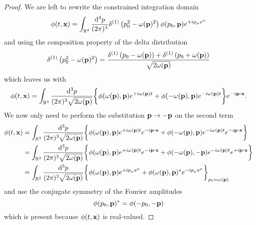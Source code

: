 \begin{proof}
	We are left to rewrite the constrained integration domain
	\begin{equation*}
		\phi(t,\vb{x})
		=
		\int_{\mathbb{R}^4}\frac{\dd[4]{p}}{(2\pi)^3}
		\delta^{(1)}\left(p_0^2-\omega(\vb{p})^2\right)
		\phi(p_0,\vb{p})
		e^{+ip_\mu x^\mu}
	\end{equation*}
	and using the composition property of the delta distribution
	\begin{equation*}
		\delta^{(1)}\left(p_0^2-\omega(\vb{p})^2\right)
		=
		\frac{
			\delta^{(1)}\left(p_0-\omega(\vb{p})\right)
			+
			\delta^{(1)}\left(p_0+\omega(\vb{p})\right)
		}{\sqrt{2\omega(\vb{p})}}
	\end{equation*}
	which leaves us with
	\begin{equation*}
		\phi(t,\vb{x})
		=
		\int_{\mathbb{R}^3}\frac{\dd[3]{p}}{(2\pi)^3\sqrt{2\omega(\vb{p})}}
		\biggl\{
			\phi(\omega(\vb{p}),\vb{p})
			e^{+i\omega(\vb{p})t}
			+
			\phi(-\omega(\vb{p}),\vb{p})
			e^{-i\omega(\vb{p})t}
		\biggr\}
		e^{-i\vb{p}\vdot\vb{x}}
		.
	\end{equation*}
	We now only need to perform the substitution $\vb{p}\to-\vb{p}$ on the second term
	\begin{equation*}
		\begin{split}
			\phi(t,\vb{x})
			&=
			\int_{\mathbb{R}^3}\frac{\dd[3]{p}}{(2\pi)^3\sqrt{2\omega(\vb{p})}}
			\biggl\{
				\phi(\omega(\vb{p}),\vb{p})
				e^{+i\omega(\vb{p})t}
				e^{-i\vb{p}\vdot\vb{x}}
				+
				\phi(-\omega(\vb{p}),\vb{p})
				e^{-i\omega(\vb{p})t}
				e^{-i\vb{p}\vdot\vb{x}}
			\biggr\}
			\\
			&=
			\int_{\mathbb{R}^3}\frac{\dd[3]{p}}{(2\pi)^3\sqrt{2\omega(\vb{p})}}
			\biggl\{
				\phi(\omega(\vb{p}),\vb{p})
				e^{+i\omega(\vb{p})t}
				e^{-i\vb{p}\vdot\vb{x}}
				+
				\phi(-\omega(\vb{p}),-\vb{p})
				e^{-i\omega(\vb{p})t}
				e^{+i\vb{p}\vdot\vb{x}}
			\biggr\}
			\\
			&=
			\int_{\mathbb{R}^3}\frac{\dd[3]{p}}{(2\pi)^3\sqrt{2\omega(\vb{p})}}
			\biggl\{
				\phi(\omega(\vb{p}),\vb{p})
				e^{+ip_\mu x^\mu}
				+
				\phi(\omega(\vb{p}),\vb{p})^*
				e^{-ip_\mu x^\mu}
			\biggr\}_{p_0=\omega(\vb{p})}
		\end{split}
	\end{equation*}
	and use the conjugate symmetry of the Fourier amplitudes
	\begin{equation*}
		\phi(p_0,\vb{p})^*
		=
		\phi(-p_0,-\vb{p})
	\end{equation*}
	which is present because $\phi(t,\vb{x})$ is real-valued.
\end{proof}

